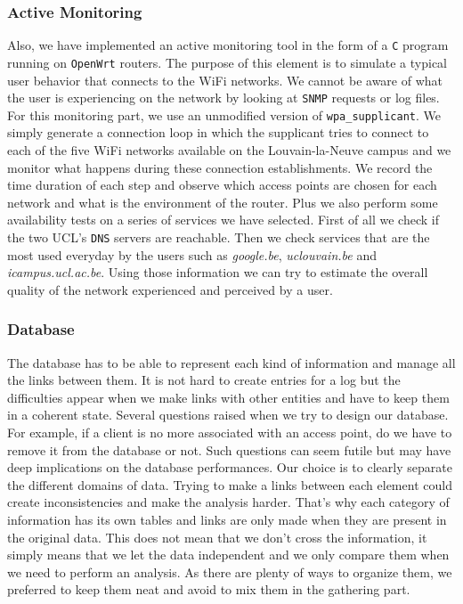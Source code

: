 \subsubsection{Active Monitoring}
Also, we have implemented an active monitoring tool in the form of a \texttt{C} program running on \texttt{OpenWrt} routers. The purpose of this element is to simulate a typical user behavior that connects to the WiFi networks. We cannot be aware of what the user is experiencing on the network by looking at \texttt{SNMP} requests or log files. For this monitoring part, we use an unmodified version of \texttt{wpa\_supplicant}. We simply generate a connection loop in which the supplicant tries to connect to each of the five WiFi networks available on the Louvain-la-Neuve campus and we monitor what happens during these connection establishments. We record the time duration of each step and observe which access points are chosen for each network and what is the environment of the router. Plus we also perform some availability tests on a series of services we have selected. First of all we check if the two UCL's \texttt{DNS} servers are reachable. Then we check services that are the most used everyday by the users such as \textit{google.be}, \textit{uclouvain.be} and \textit{icampus.ucl.ac.be}. Using those information we can try to estimate the overall quality of the network experienced and perceived by a user.

\subsubsection{Database}
The database has to be able to represent each kind of information and manage all the links between them. It is not hard to create entries for a log but the difficulties appear when we make links with other entities and have to keep them in a coherent state. Several questions raised when we try to design our database. For example, if a client is no more associated with an access point, do we have to remove it from the database or not. Such questions can seem futile but may have deep implications on the database performances. Our choice is to clearly separate the different domains of data. Trying to make a links between each element could create inconsistencies and make the analysis harder. That's why each category of information has its own tables and links are only made when they are present in the original data. This does not mean that we don't cross the information, it simply means that we let the data independent and we only compare them when we need to perform an analysis. As there are plenty of ways to organize them, we preferred to keep them neat and avoid to mix them in the gathering part.

